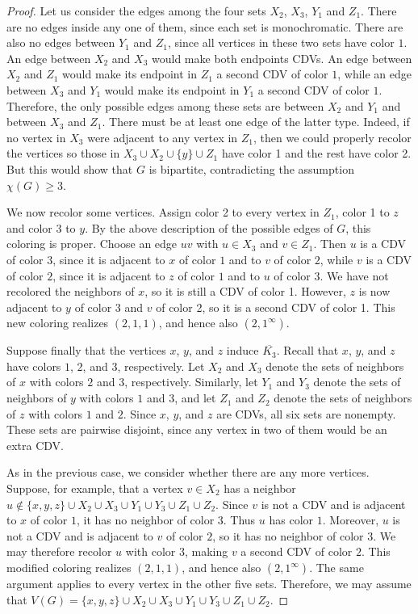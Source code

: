 \documentclass[10pt,a4paper]{amsart}
\begin{document}
\begin{proof}
Let us consider the edges among the four sets $X_2$, $X_3$, $Y_1$ and $Z_1$. 
There are no edges inside any one of them, since each set is monochromatic.
There are also no edges between $Y_1$ and $Z_1$, since all vertices in these two sets have color $1$. 
An edge between $X_2$ and $X_3$ would make both endpoints CDVs.
An edge between $X_2$ and $Z_1$ would make its endpoint in $Z_1$ a second CDV of color $1$, while an edge between $X_3$ and $Y_1$ would make its endpoint in $Y_1$ a second CDV of color $1$.
Therefore, the only possible edges among these sets are between $X_2$ and $Y_1$ and between $X_3$ and $Z_1$.
There must be at least one edge of the latter type.
Indeed, if no vertex in $X_3$ were adjacent to any vertex in $Z_1$, then we could properly recolor the vertices so those in $X_3\cup X_2\cup\{y\}\cup Z_1$ have color 1 and the rest have color 2.
But this would show that $G$ is bipartite, contradicting the assumption $\chi(G)\geq3$.

We now recolor some vertices.
Assign color 2 to every vertex in $Z_1$, color 1 to $z$ and color 3 to $y$.
By the above description of the possible edges of $G$, this coloring is proper. 
Choose an edge $uv$ with $u\in X_3$ and $v\in Z_1$.
Then $u$ is a CDV of color $3$, since it is adjacent to $x$ of color $1$ and to $v$ of color $2$, while $v$ is a CDV of color $2$, since it is adjacent to $z$ of color $1$ and to $u$ of color $3$. 
We have not recolored the neighbors of $x$, so it is still a CDV of color 1.
However, $z$ is now adjacent to $y$ of color 3 and $v$ of color 2, so it is a second CDV of color 1.
This new coloring realizes $(2,1,1)$, and hence also $(2,1^\infty)$.

\smallskip

Suppose finally that the vertices $x$, $y$, and $z$ induce $\overline{K_3}$. Recall that $x$, $y$, and $z$ have colors $1$, $2$, and $3$, respectively. Let $X_2$ and $X_3$ denote the sets of neighbors of $x$ with colors $2$ and $3$, respectively. Similarly, let $Y_1$ and $Y_3$ denote the sets of neighbors of $y$ with colors $1$ and $3$, and let $Z_1$ and $Z_2$ denote the sets of neighbors of $z$ with colors $1$ and $2$. Since $x$, $y$, and $z$ are CDVs, all six sets are nonempty. 
These sets are pairwise disjoint, since any vertex in two of them would be an extra CDV.

As in the previous case, we consider whether there are any more vertices.
Suppose, for example, that a vertex $v\in X_2$ has a neighbor
$u\notin\{x,y,z\}\cup X_2\cup X_3\cup Y_1\cup Y_3\cup Z_1\cup Z_2$.
Since $v$ is not a CDV and is adjacent to $x$ of color $1$, it has no neighbor of color $3$. Thus $u$ has color $1$. Moreover, $u$ is not a CDV and is adjacent to $v$ of color $2$, so it has no neighbor of color $3$. We may therefore recolor $u$ with color $3$, making $v$ a second CDV of color $2$. This modified coloring realizes $(2,1,1)$, and hence also $(2,1^\infty)$. The same argument applies to every vertex in the other five sets. Therefore, we may assume that
$V(G)=\{x,y,z\}\cup X_2\cup X_3\cup Y_1\cup Y_3\cup Z_1\cup Z_2$.


\end{proof}
\end{document}
